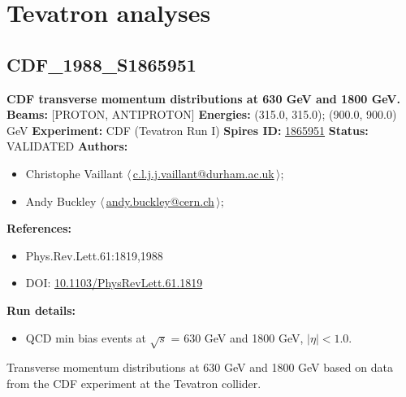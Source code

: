 \section{Tevatron analyses}\subsection[CDF\_1988\_S1865951]{CDF\_1988\_S1865951\,\cite{Abe:1988yu}}
\textbf{CDF transverse momentum distributions at 630 GeV and 1800 GeV.}\newline
\textbf{Beams:} [PROTON, ANTIPROTON] \newline
\textbf{Energies:} (315.0, 315.0); (900.0, 900.0) GeV \newline
\textbf{Experiment:} CDF (Tevatron Run I) \newline
\textbf{Spires ID:} \href{http://www.slac.stanford.edu/spires/find/hep/www?rawcmd=key+1865951}{1865951}\newline
\textbf{Status:} VALIDATED\newline
\textbf{Authors:}
\begin{itemize}
  \item Christophe Vaillant $\langle\,$\href{mailto:c.l.j.j.vaillant@durham.ac.uk}{c.l.j.j.vaillant@durham.ac.uk}$\,\rangle$;
  \item Andy Buckley $\langle\,$\href{mailto:andy.buckley@cern.ch}{andy.buckley@cern.ch}$\,\rangle$;
\end{itemize}
\textbf{References:}
\begin{itemize}
  \item Phys.Rev.Lett.61:1819,1988
  \item DOI: \href{http://dx.doi.org/10.1103/PhysRevLett.61.1819}{10.1103/PhysRevLett.61.1819}
\end{itemize}
\textbf{Run details:}
\begin{itemize}

  \item QCD min bias events at \ensuremath{\sqrt{s}} = 630 GeV and 1800 GeV, $|\eta| < 1.0$.\end{itemize}

\noindent Transverse momentum distributions at 630 GeV and 1800 GeV based on data from the CDF experiment at the Tevatron collider.

\clearpage


\clearpage

